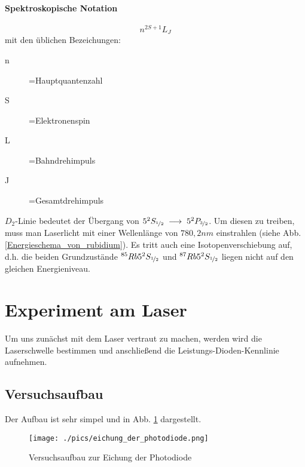 \documentclass[a4paper,oneside]{article}
\begin{document}
\paragraph*{Spektroskopische Notation}
\begin{equation}
 n^{2S+1}L_J
\end{equation}
mit den üblichen Bezeichungen:

\begin{description}
 \item[n]=Hauptquantenzahl
 \item[S]=Elektronenspin
 \item[L]=Bahndrehimpuls
 \item[J]=Gesamtdrehimpuls
\end{description}
$D_2$-Linie bedeutet der Übergang von $5^2S_{\nicefrac{1}{2}}\;\longrightarrow\;5^2P_{\nicefrac{3}{2}}$.
Um diesen zu treiben, muss man Laserlicht mit einer Wellenlänge von $780,2nm$ einstrahlen (siehe Abb. \ref{Energieschema_von_rubidium}). Es tritt auch eine Isotopenverschiebung auf, d.h. die beiden Grundzustände $^{85}Rb 5^2S_{\nicefrac{1}{2}}$ und $^{87}Rb 5^2S_{\nicefrac{1}{2}}$ liegen nicht auf den gleichen Energieniveau.






\section{Experiment am Laser}
Um uns zunächst mit dem Laser vertraut zu machen, werden wird die Laserschwelle bestimmen und anschließend die Leistungs-Dioden-Kennlinie aufnehmen.
\subsection{Versuchsaufbau}
Der Aufbau ist sehr simpel und in Abb. \ref{Photodiodeneichung} dargestellt.

\begin{figure}
 \centering
 \texttt{[image: ./pics/eichung\_der\_photodiode.png]}
 \caption[Photodiodeneichung]{Versuchsaufbau zur Eichung der Photodiode}
 \label{Photodiodeneichung}
\end{figure}
\end{document}
